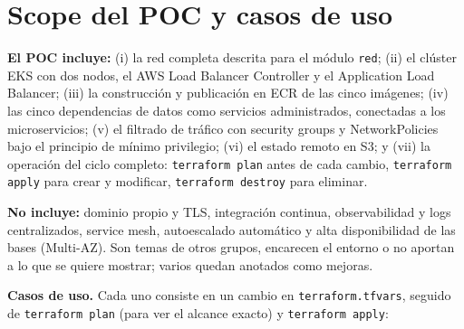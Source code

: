 \documentclass[11pt,a4paper]{article}
\newcommand{\code}[1]{\texttt{#1}}
\begin{document}
\section{Scope del POC y casos de uso}

\textbf{El POC incluye:} (i) la red completa descrita para el módulo \code{red}; (ii) el
clúster EKS con dos nodos, el AWS Load Balancer Controller y el Application Load Balancer;
(iii) la construcción y
publicación en ECR de las cinco imágenes; (iv) las cinco dependencias de datos como servicios
administrados, conectadas a los microservicios; (v) el filtrado de tráfico con security groups
y NetworkPolicies bajo el principio de mínimo privilegio; (vi) el estado remoto en S3; y (vii)
la operación del ciclo completo: \code{terraform plan} antes de cada cambio,
\code{terraform apply} para crear y modificar, \code{terraform destroy} para eliminar.

\textbf{No incluye:} dominio propio y TLS, integración continua, observabilidad y logs
centralizados, service mesh, autoescalado automático y alta disponibilidad de las bases
(Multi-AZ). Son temas de otros grupos, encarecen el entorno o no aportan a lo que se quiere
mostrar; varios quedan anotados como mejoras.

\textbf{Casos de uso.} Cada uno consiste en un cambio en \code{terraform.tfvars}, seguido de
\code{terraform plan} (para ver el alcance exacto) y \code{terraform apply}:
\end{document}
